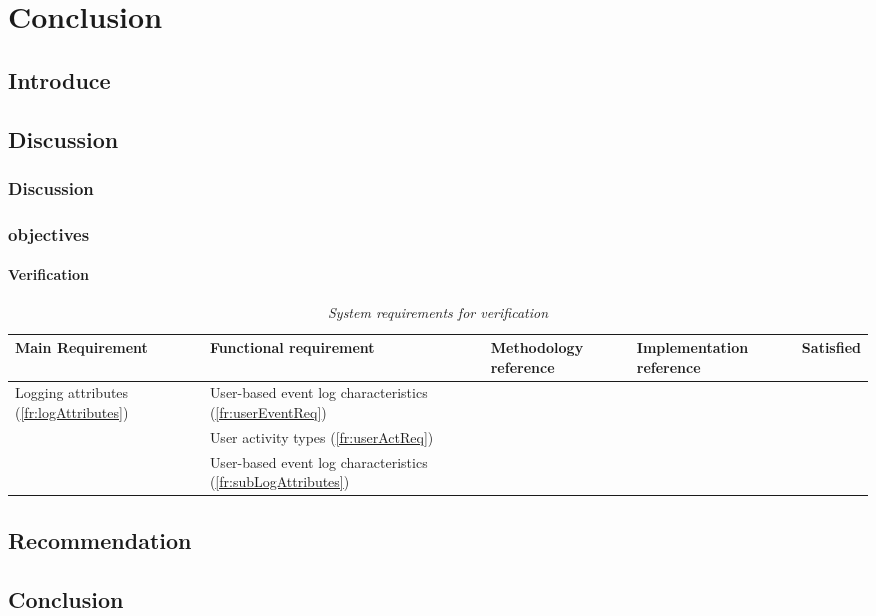 \chapter{Conclusion}
\label{chap:4}

\section{Introduce}
\section{Discussion}

\subsection{Discussion}

\subsection{objectives}

\begin{landscape}
	\subsubsection{Verification}

	\begin{table}[!htb]
		\centering
		\small
		\caption[System requirements for verification]
		{\textit{System requirements for verification}}
		\label{tbl:ch2_verification}
		\begin{tabularx}{\linewidth}{|l|X|X|X|c|}
			\hline \textbf{Main Requirement} & \textbf{Functional requirement} & \textbf{Methodology reference} & \textbf{Implementation reference} & \textbf{Satisfied} \\ 
			\hline \multirow{3}{*}{Logging attributes (\ref{fr:logAttributes})} & User-based event log characteristics (\ref{fr:userEventReq}) & \Cref{sec:ch2_requirementsOfUAT} &  & \cmark \\
				& User activity types (\ref{fr:userActReq}) & \Cref{sec:ch2_userActivityTypes} &  & \cmark \\ \cline{2-5}
				& User-based event log characteristics (\ref{fr:subLogAttributes}) & \Cref{sec:ch2_logAttributesRequirements} & \Cref{sec:ch3_logAtrributes} & \cmark \\ \cline{2-5}\cline{2-5}
			\hline
		\end{tabularx}
	\end{table}
\end{landscape}

\section{Recommendation}

\section{Conclusion}